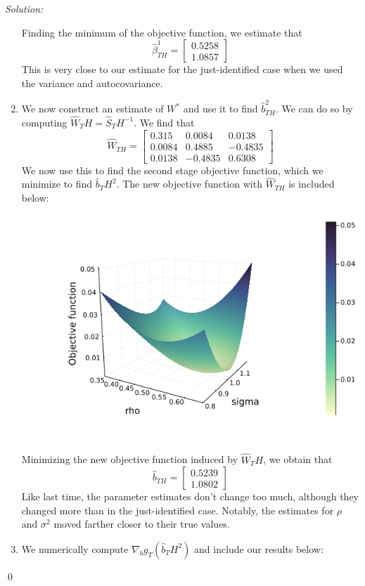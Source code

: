 \documentclass[12pt]{article}
\newenvironment{sol}
    {\emph{Solution:}
    }
    {
    \qed
    }
\begin{document}
\begin{sol}
\begin{enumerate}[label=\alph*) ]
        Finding the minimum of the objective function, we estimate that
        \[\hat{\beta}_{TH}^1 = \begin{bmatrix} 0.5258 \\1.0857\end{bmatrix}\]
        This is very close to our estimate for the just-identified case when we used the variance and autocovariance.
        \item We now construct an estimate of $W^*$ and use it to find $\hat{b}_{TH}^2$. We can do so by computing $\hat{W}_TH = \hat{S}_TH^{-1}$. We find that
        \[\hat{W}_{TH} = \begin{bmatrix} 0.315 &0.0084&0.0138\\ 0.0084 &0.4885& -0.4835\\ 0.0138 &-0.4835& 0.6308\end{bmatrix}\]
        We now use this to find the second stage objective function, which we minimize to find $\hat{b}_TH^2$. The new objective function with $\hat{W}_{TH}$ is included below:
        \begin{center}
            \includegraphics[scale=0.4]{jthplot_3_2nd.png}
        \end{center}
        Minimizing the new objective function induced by $\hat{W}_TH$, we obtain that
        \[\hat{b}_{TH} = \begin{bmatrix}0.5239\\ 1.0802\end{bmatrix}\]
        Like last time, the parameter estimates don't change too much, although they changed more than in the just-identified case. Notably, the estimates for $\rho$ and $\sigma^2$ moved farther closer to their true values.
        \item We numerically compute $\nabla_b g_T(\hat{b}_TH^2)$ and include our results below:

\end{enumerate}
\end{sol}
\end{document}
